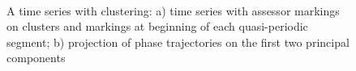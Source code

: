 \documentclass[12pt, twoside]{article}
\numberwithin{equation}{section}
\begin{document}
\begin{figure}[h!t]\center
{}
\\
\caption{A time series with clustering:  a) time series with assessor markings on clusters and markings at beginning of each quasi-periodic segment; b) projection of phase trajectories on the first two principal components}
\end{figure}
\end{document}
